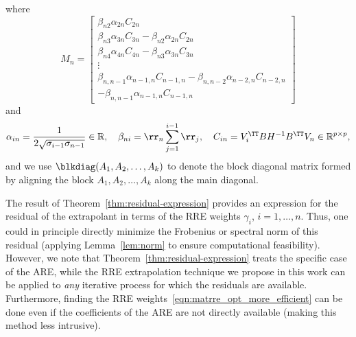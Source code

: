 \begin{thm}
\begin{equation*}
	\end{equation*}
	where
	\begin{equation*}
		M_n = \begin{bmatrix}
			\beta_{n2}\alpha_{2n}C_{2n}  \\
			\beta_{n3}\alpha_{3n}C_{3n}-\beta_{n2}\alpha_{2n}C_{2n} \\
			\beta_{n4}\alpha_{4n}C_{4n}-\beta_{n3}\alpha_{3n}C_{3n} \\
			\vdots \\
			\beta_{n,n-1}\alpha_{n-1,n}C_{n-1,n}-\beta_{n,n-2}\alpha_{n-2,n}C_{n-2,n} \\
			-\beta_{n,n-1}\alpha_{n-1,n}C_{n-1,n}
		\end{bmatrix}
	\end{equation*}
	and
	\begin{equation*}
		\alpha_{in}=
		\frac{1}{2\sqrt{\sigma_{i-1}\sigma_{n-1}}}\in\mathbb{R},\quad
		\beta_{ni}=\rr_n\sum_{j=1}^{i-1}\rr_j,\quad
		C_{in} = V_i^\TT BH^{-1}B^\TT V_n \in\mathbb{R}^{p\times p},
	\end{equation*}
and we use $\blkdiag(A_1,A_2,\dots,A_k)$ to denote the block diagonal matrix formed by aligning the block $A_1,A_2,\dots,A_k$ along the main diagonal.
\end{thm}

\begin{remark}
  The result of Theorem~\ref{thm:residual-expression} provides an expression for the residual of the extrapolant in terms of the \ac{RRE} weights $\gamma_i$, $i = 1, \ldots, n$.
Thus, one could in principle directly minimize the Frobenius or spectral norm of this residual (applying Lemma~\ref{lem:norm} to ensure computational feasibility).
However, we note that Theorem~\ref{thm:residual-expression} treats the specific case of the \ac{ARE}, while the \ac{RRE} extrapolation technique we propose in this work can be applied to \emph{any} iterative process for which the residuals are available.
Furthermore, finding the \ac{RRE} weights~\eqref{eqn:matrre_opt_more_efficient} can be done even if the coefficients of the \ac{ARE} are not directly available (making this method less intrusive).
\end{remark}

